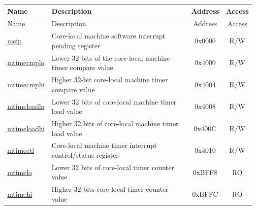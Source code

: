 
\begin{longtable}{ | p{4.0cm} | p{8.4cm} | c | c| }
\hline\rowcolor{lightgray}
Name & Description & Address & Access \\ \hline
\endfirsthead
\hline
\rowcolor{lightgray}
Name & Description & Address & Access  \\
\hline
\endhead
\endfoot

\hyperref[regdesc:CLINTMSIPREG] {msip} & Core-local machine software interrupt pending register & 0x0000 & R/W \\\hline
\hyperref[regdesc:CLINTMTIMECMPLOREG] {mtimecmplo} & Lower 32 bits of the core-local machine timer compare value & 0x4000 & R/W \\\hline
\hyperref[regdesc:CLINTMTIMECMPHIREG] {mtimecmphi} & Higher 32-bit core-local machine timer compare value & 0x4004 & R/W \\\hline
\hyperref[regdesc:CLINTMTIMELOADLOREG] {mtimeloadlo} & Lower 32 bits of core-local machine timer load value & 0x4008 & R/W \\\hline
\hyperref[regdesc:CLINTMTIMELOADHIREG] {mtimeloadhi} & Higher 32 bits of core-local machine timer load value & 0x400C & R/W \\\hline
\hyperref[regdesc:CLINTMTIMECTLREG] {mtimectl} & Core-local machine timer interrupt control/status register & 0x4010 & R/W \\\hline
\hyperref[regdesc:CLINTMTIMELOREG] {mtimelo} & Lower 32 bits of core-local timer counter value & 0xBFF8 & RO \\\hline
\hyperref[regdesc:CLINTMTIMELOREG] {mtimehi} & Higher 32 bits core-local timer counter value & 0xBFFC & RO \\\hline
\end{longtable}